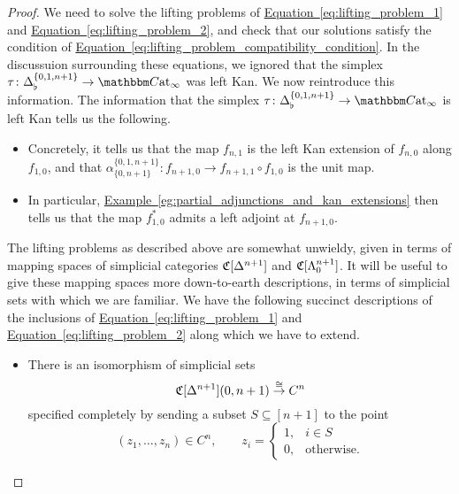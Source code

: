 \documentclass[main.tex]{subfiles}
\begin{document}
\begin{proof}
  We need to solve the lifting problems of \hyperref[eq:lifting_problem_1]{Equation~\ref*{eq:lifting_problem_1}} and \hyperref[eq:lifting_problem_2]{Equation~\ref*{eq:lifting_problem_2}}, and check that our solutions satisfy the condition of \hyperref[eq:lifting_problem_compatibility_condition]{Equation~\ref*{eq:lifting_problem_compatibility_condition}}. In the discussuion surrounding these equations, we ignored that the simplex $\tau\colon \Delta^{\{0,1,n+1\}}_{\flat} \to \ICCat$ was left Kan. We now reintroduce this information. The information that the simplex $\tau\colon \Delta^{\{0,1,n+1\}}_{\flat} \to \ICCat$ is left Kan tells us the following.
  \begin{itemize}
    \item  Concretely, it tells us that the map $f_{n,1}$ is the left Kan extension of $f_{n, 0}$ along $f_{1, 0}$, and that $\alpha_{\{0,n+1\}}^{\{0,1,n+1\}}\colon f_{n+1,0} \to f_{n+1, 1} \circ f_{1, 0} $ is the unit map.

    \item In particular, \hyperref[eg:partial_adjunctions_and_kan_extensions]{Example~\ref*{eg:partial_adjunctions_and_kan_extensions}} then tells us that the map $f_{1,0}^{*}$ admits a left adjoint at $f_{n+1,0}$.
  \end{itemize}

  The lifting problems as described above are somewhat unwieldy, given in terms of mapping spaces of simplicial categories $\mathfrak{C}[\Delta^{n+1}]$ and $\mathfrak{C}[\Lambda^{n+1}_{0}]$. It will be useful to give these mapping spaces more down-to-earth descriptions, in terms of simplicial sets with which we are familiar. We have the following succinct descriptions of the inclusions of \hyperref[eq:lifting_problem_1]{Equation~\ref*{eq:lifting_problem_1}} and \hyperref[eq:lifting_problem_2]{Equation~\ref*{eq:lifting_problem_2}} along which we have to extend.
  \begin{itemize}
    \item There is an isomorphism of simplicial sets
      \begin{equation*}
        \mathfrak{C}[\Delta^{n+1}](0, n+1) \overset{\cong}{\to} C^{n}
      \end{equation*}
      specified completely by sending a subset $S \subseteq [n+1]$ to the point
      \begin{equation*}
        (z_{1}, \ldots, z_{n}) \in C^{n},\qquad z_{i} =
        \begin{cases}
          1, & i \in S \\
          0, &\text{otherwise.}
        \end{cases}
      \end{equation*}


\end{itemize}
\end{proof}
\end{document}
